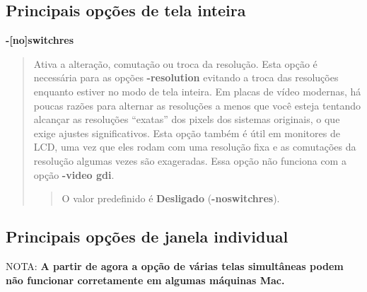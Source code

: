 \documentclass[letterpaper,10pt,brazil]{sphinxmanual}
\begin{document}
\subsection{Principais opções de tela inteira}
\label{commandline/commandline-all:principais-opcoes-de-tela-inteira}\label{commandline/commandline-all:mame-commandline-switchres}
\textbf{-{[}no{]}switchres}
\begin{quote}

Ativa a alteração, comutação ou troca da resolução. Esta opção é
necessária para as opções \textbf{-resolution} evitando a troca das
resoluções enquanto estiver no modo de tela inteira. Em placas de
vídeo modernas, há poucas razões para alternar as resoluções a menos
que você esteja tentando alcançar as resoluções ``exatas'' dos pixels
dos sistemas originais, o que exige ajustes significativos.
Esta opção também é útil em monitores de LCD, uma vez que eles rodam
com uma resolução fixa e as comutações da resolução algumas vezes
são exageradas. Essa opção não funciona com a opção \textbf{-video gdi}.
\begin{quote}

O valor predefinido é \textbf{Desligado} (\textbf{-noswitchres}).
\end{quote}
\end{quote}


\subsection{Principais opções de janela individual}
\label{commandline/commandline-all:principais-opcoes-de-janela-individual}\label{commandline/commandline-all:mame-commandline-screen}
NOTA: \textbf{A partir de agora a opção de várias telas simultâneas podem não
funcionar corretamente em algumas máquinas Mac.}
\end{document}
